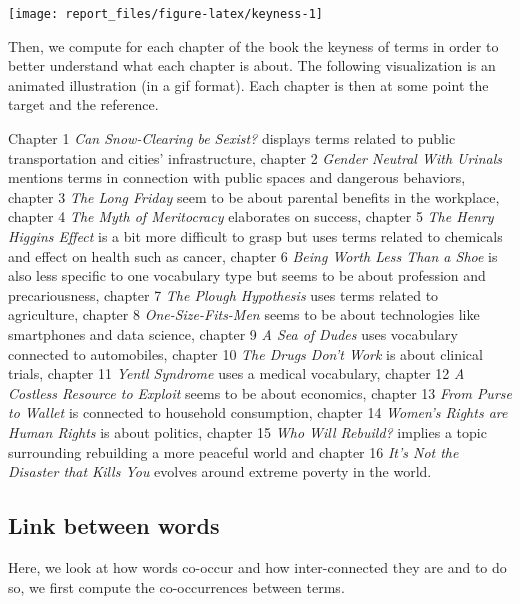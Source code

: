 \documentclass[
]{article}
\begin{document}
\begin{center}\texttt{[image: report\_files/figure-latex/keyness-1]} \end{center}

Then, we compute for each chapter of the book the keyness of terms in
order to better understand what each chapter is about. The following
visualization is an animated illustration (in a gif format). Each
chapter is then at some point the target and the reference.

Chapter 1 \emph{Can Snow-Clearing be Sexist?} displays terms related to
public transportation and cities' infrastructure, chapter 2 \emph{Gender
Neutral With Urinals} mentions terms in connection with public spaces
and dangerous behaviors, chapter 3 \emph{The Long Friday} seem to be
about parental benefits in the workplace, chapter 4 \emph{The Myth of
Meritocracy} elaborates on success, chapter 5 \emph{The Henry Higgins
Effect} is a bit more difficult to grasp but uses terms related to
chemicals and effect on health such as cancer, chapter 6 \emph{Being
Worth Less Than a Shoe} is also less specific to one vocabulary type but
seems to be about profession and precariousness, chapter 7 \emph{The
Plough Hypothesis} uses terms related to agriculture, chapter 8
\emph{One-Size-Fits-Men} seems to be about technologies like smartphones
and data science, chapter 9 \emph{A Sea of Dudes} uses vocabulary
connected to automobiles, chapter 10 \emph{The Drugs Don't Work} is
about clinical trials, chapter 11 \emph{Yentl Syndrome} uses a medical
vocabulary, chapter 12 \emph{A Costless Resource to Exploit} seems to be
about economics, chapter 13 \emph{From Purse to Wallet} is connected to
household consumption, chapter 14 \emph{Women's Rights are Human Rights}
is about politics, chapter 15 \emph{Who Will Rebuild?} implies a topic
surrounding rebuilding a more peaceful world and chapter 16 \emph{It's
Not the Disaster that Kills You} evolves around extreme poverty in the
world.

\begin{center}\end{center}

\hypertarget{link-between-words}{%
\subsection{Link between words}\label{link-between-words}}

Here, we look at how words co-occur and how inter-connected they are and
to do so, we first compute the co-occurrences between terms.
\end{document}
